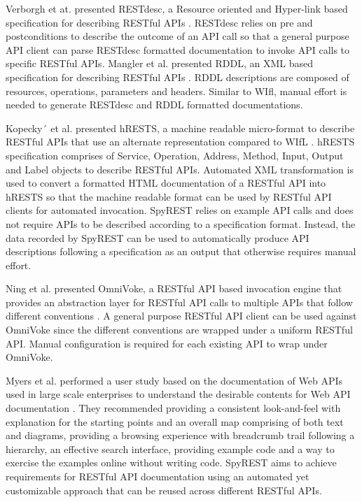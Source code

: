 \documentclass[conference]{IEEEtran}
\begin{document}
Verborgh et at. presented RESTdesc, a Resource oriented and Hyper-link based specification for describing RESTful APIs \cite{Verborgh_functional}. RESTdesc relies on pre and postconditions to describe the outcome of an API call so that a general purpose API client can parse RESTdesc formatted documentation to invoke API calls to specific RESTful APIs. Mangler et al. presented RDDL, an XML based specification for describing RESTful APIs \cite{Mangler_rddl}. RDDL descriptions are composed of resources, operations, parameters and headers. Similar to WIfl, manual effort is needed to generate RESTdesc and RDDL formatted documentations.

Kopecky´ et al. presented hRESTS, a machine readable micro-format to describe RESTful APIs that use an alternate representation compared to WIfL \cite{Kopecky_hrests}. hRESTS specification comprises of Service, Operation, Address, Method, Input, Output and Label objects to describe RESTful APIs. Automated XML transformation is used to convert a formatted HTML documentation of a RESTful API into hRESTS so that the machine readable format can be used by RESTful API clients for automated invocation. SpyREST relies on example API calls and does not require APIs to be described according to a specification format. Instead, the data recorded by SpyREST can be used to automatically produce API descriptions following a specification as an output that otherwise requires manual effort.

Ning et al. presented OmniVoke, a RESTful API based invocation engine that provides an abstraction layer for RESTful API calls to multiple APIs that follow different conventions \cite{Ning_omnivoke}. A general purpose RESTful API client can be used against OmniVoke since the different conventions are wrapped under a uniform RESTful API. Manual configuration is required for each existing API to wrap under OmniVoke.

Myers et al. performed a user study based on the documentation of Web APIs used in large scale enterprises to understand the desirable contents for Web API documentation \cite{Myers_study}. They recommended providing a consistent look-and-feel with explanation for the starting points and an overall map comprising of both text and diagrams, providing a browsing experience with breadcrumb trail following a hierarchy, an effective search interface, providing example code and a way to exercise the examples online without writing code. SpyREST aims to achieve requirements for RESTful API documentation using an automated yet customizable approach that can be reused across different RESTful APIs.
\end{document}
